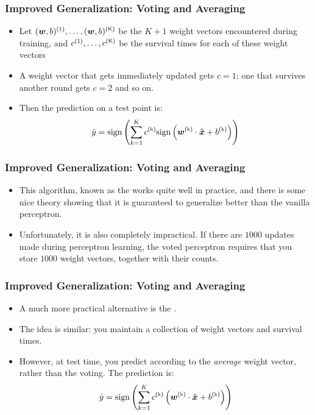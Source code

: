 \documentclass[trans]{beamer}
\begin{document}
\begin{frame}
  \frametitle{Improved Generalization: Voting and Averaging}
\begin{itemize}
\item 
Let $(\vw,b)\oth, \dots,
(\vw,b)\Kth$ be the $K+1$ weight vectors encountered during training,
and $c\oth, \dots, c\Kth$ be the survival times for each of these
weight vectors
\item A weight vector that gets immediately updated gets
$c=1$; one that survives another round gets $c=2$ and so on.
\item  Then
the prediction on a test point is:
\begin{equation} \label{eq:perc:vote}
  \hat y = \sign \left(
    \sum_{k=1}^K c\kth 
      \sign \left(
        \dotp{\vw\kth}{\hat\vx} + b\kth
        \right)
      \right)
\end{equation}
\end{itemize}
\end{frame}
\begin{frame}
  \frametitle{Improved Generalization: Voting and Averaging}
\begin{itemize}
\item 
This algorithm, known as the  works quite
well in practice, and there is some nice theory showing that it is
guaranteed to generalize better than the vanilla perceptron.
\item 
Unfortunately, it is also completely impractical.  If there are $1000$
updates made during perceptron learning, the voted perceptron requires
that you store $1000$ weight vectors, together with their counts.

\end{itemize}
\end{frame}
\begin{frame}
  \frametitle{Improved Generalization: Voting and Averaging}
\begin{itemize}
\item 
A much more practical alternative is the .
  \item  The idea is similar: you maintain a collection of
weight vectors and survival times.  
\item However, at test time, you predict
according to the \emph{average} weight vector, rather than the
voting. The prediction is:
\begin{equation} \label{eq:perc:avg}
  \hat y = \sign \left(
    \sum_{k=1}^K c\kth 
      \left(
        \dotp{\vw\kth}{\hat\vx} + b\kth
        \right)
      \right)
\end{equation}
\end{itemize}
\end{frame}
\end{document}

